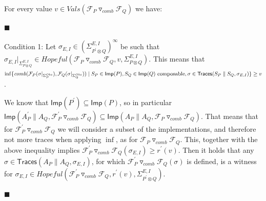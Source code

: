 \documentclass[10pt,a4paper]{article}
\begin{document}
 
 
For every value $v\in Vals({{\mathcal{F}_{P}}\mathbin{\triangledown_{\mathit{comb}}}{\mathcal{F}_{Q}}})$ we have:\par
  
\par\noindent  $\blacksquare$ 
 
Condition 1: Let $\sigma_{E,I}\in(\Sigma_{P^{\prime}\otimes Q}^{E,I})^{\infty}$ be such that $\sigma_{E,I}|_{\Sigma_{P\otimes Q}^{E,I}}\in\mathit{Hopeful}({{\mathcal{F}_{P}}\mathbin{\triangledown_{\mathit{comb}}}{\mathcal{F}_{Q}}},v,\Sigma_{P\otimes Q}^{E,I})$. This means that $\inf\{\mathit{comb}(\mathcal{F}_{P}(\sigma|_{\Sigma_{P}^{Obs}}),\mathcal{F}_{Q}(\sigma|_{\Sigma_{Q}^{Obs}}))\mid S_{P}\in\mathsf{Imp}(P),S_{Q}\in\mathsf{Imp}(Q)\text{ composable},\\
\sigma\in\mathsf{Traces}(S_{P}\parallel S_{Q},\sigma_{E,I})\}\geq v$.\par
 
 
 
We know that $\mathsf{Imp}(P^{\prime})\subseteq\mathsf{Imp}(P)$, so in particular $\mathsf{Imp}(A_{P}^{\prime}\parallel A_{Q},{{\mathcal{F}_{P}^{\prime}}\mathbin{\triangledown_{\mathit{comb}}}{\mathcal{F}_{Q}}})\subseteq\mathsf{Imp}(A_{P}\parallel A_{Q},{{\mathcal{F}_{P}}\mathbin{\triangledown_{\mathit{comb}}}{\mathcal{F}_{Q}}})$. That means that for ${{\mathcal{F}_{P}^{\prime}}\mathbin{\triangledown_{\mathit{comb}}}{\mathcal{F}_{Q}}}$ we will consider a subset of the implementations, and therefore not more traces when applying $\inf$, as for ${{\mathcal{F}_{P}}\mathbin{\triangledown_{\mathit{comb}}}{\mathcal{F}_{Q}}}$. This, together with the above inequality implies ${{\mathcal{F}_{P}^{\prime}}\mathbin{\triangledown_{\mathit{comb}}}{\mathcal{F}_{Q}}}(\sigma_{E,I})\geq r^{\prime}(v)$. Then it holds that any $\sigma\in\mathsf{Traces}(A_{P}\parallel A_{Q},\sigma_{E,I})$, for which ${{\mathcal{F}_{P}^{\prime}}\mathbin{\triangledown_{\mathit{comb}}}{\mathcal{F}_{Q}}}(\sigma)$ is defined, is a witness for $\sigma_{E,I}\in\mathit{Hopeful}({{\mathcal{F}_{P}^{\prime}}\mathbin{\triangledown_{\mathit{comb}}}{\mathcal{F}_{Q}}},r^{\prime}(v),\Sigma_{P^{\prime}\otimes Q}^{E,I})$.\par
 
 
 
\par\noindent  $\blacksquare$ 
 
\end{document}
